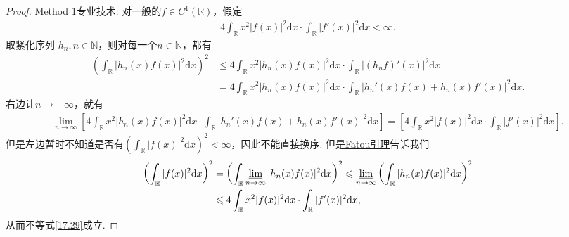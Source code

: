 \documentclass[../../main.tex]{subfiles}%
\begin{document}
\begin{proof}

{\heiti Method 1专业技术:}
对一般的$f\in C^1(\mathbb{R})$，假定
\begin{align*}
4\int_{\mathbb{R}}x^2|f(x)|^2\mathrm{d}x\cdot\int_{\mathbb{R}}|f'(x)|^2\mathrm{d}x < \infty.
\end{align*}
取紧化序列 $h_n, n\in\mathbb{N}$，则对每一个$n\in\mathbb{N}$，都有
\begin{align*}
\left( \int_{\mathbb{R}}|h_n(x)f(x)|^2\mathrm{d}x \right)^2 &\leqslant 4\int_{\mathbb{R}}x^2|h_n(x)f(x)|^2\mathrm{d}x\cdot\int_{\mathbb{R}}|(h_nf)'(x)|^2\mathrm{d}x \\
&= 4\int_{\mathbb{R}}x^2|h_n(x)f(x)|^2\mathrm{d}x\cdot\int_{\mathbb{R}}|h_n'(x)f(x) + h_n(x)f'(x)|^2\mathrm{d}x.
\end{align*}
右边让$n\to +\infty$，就有
\begin{align*}
\lim_{n\to\infty}\left[4\int_{\mathbb{R}}x^2|h_n(x)f(x)|^2\mathrm{d}x\cdot\int_{\mathbb{R}}|h_n'(x)f(x) + h_n(x)f'(x)|^2\mathrm{d}x\right] =\left[4\int_{\mathbb{R}}x^2|f(x)|^2\mathrm{d}x\cdot\int_{\mathbb{R}}|f'(x)|^2\mathrm{d}x\right].
\end{align*}
但是左边暂时不知道是否有$\left(\int_{\mathbb{R}}|f(x)|^2\mathrm{d}x\right)^2 < \infty$，因此不能直接换序. 但是\hyperref[Real Analysis-theorem:Fatou引理]{Fatou引理}告诉我们
\begin{align*}
\left( \int_{\mathbb{R}}|f(x)|^2\mathrm{d}x \right)^2 &= \left( \int_{\mathbb{R}}\varliminf_{n\to\infty}|h_n(x)f(x)|^2\mathrm{d}x \right)^2 \leqslant \varliminf_{n\to\infty}\left( \int_{\mathbb{R}}|h_n(x)f(x)|^2\mathrm{d}x \right)^2 \\
&\leqslant 4\int_{\mathbb{R}}x^2|f(x)|^2\mathrm{d}x\cdot\int_{\mathbb{R}}|f'(x)|^2\mathrm{d}x,
\end{align*}
从而不等式\eqref{17.29}成立.


\end{proof}
\end{document}
